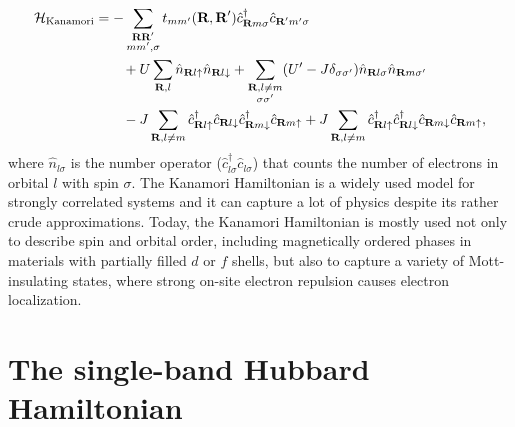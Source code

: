 \documentclass[\main/main.tex]{subfiles}
\begin{document}
\begin{align}
\begin{split}
	\mathcal{H}_{\text{Kanamori}}&=-\sum_{\substack{\textbf{R}\textbf{R}'\\ mm',\sigma}}t_{mm'}(\textbf{R},\textbf{R}')\hat c^{\dagger}_{\textbf{R}m\sigma}\hat c_{\textbf{R}'m'\sigma}\\
	&\qquad +U\sum_{\textbf{R},l} \hat n_{\textbf{R}l\uparrow}\hat n_{\textbf{R}l\downarrow}+\sum_{\substack{\textbf{R},l\neq m\\\sigma\sigma'}}(U'-J\delta_{\sigma\sigma'}) \hat n_{\textbf{R}l\sigma} \hat n_{\textbf{R}m\sigma'}\\
	&\qquad -J\sum_{\textbf{R},l\neq m}\hat c^\dagger_{\textbf{R}l\uparrow}\hat c_{\textbf{R}l\downarrow}\hat c^\dagger_{\textbf{R}m\downarrow}\hat c_{\textbf{R}m\uparrow}+J\sum_{\textbf{R},l\neq m}\hat c^\dagger_{\textbf{R}l\uparrow}\hat c^\dagger_{\textbf{R}l\downarrow}\hat c_{\textbf{R}m\downarrow}\hat c_{\textbf{R}m\uparrow},
\end{split}
\end{align}
where $\hat n_{l\sigma}$ is the number operator ($\hat c^\dagger_{l\sigma}\hat c_{l\sigma}$) that counts the number of electrons in orbital $l$ with spin $\sigma$. The Kanamori Hamiltonian is a widely used model for strongly correlated systems and it can capture a lot of physics despite its rather crude approximations. Today, the Kanamori Hamiltonian is mostly used not only to describe spin and orbital order, including magnetically ordered phases in materials with partially filled $d$ or $f$ shells, but also to capture a variety of Mott-insulating states, where strong on-site electron repulsion causes electron localization.

\section{The single-band Hubbard Hamiltonian}
\end{document}
